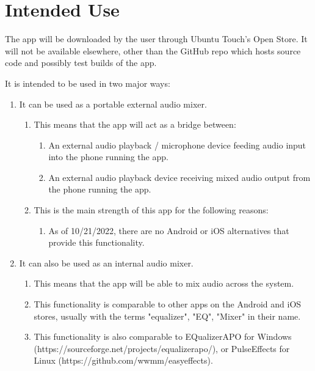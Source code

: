 \section{Intended Use}
The app will be downloaded by the user through Ubuntu Touch's Open Store. 
It will not be available elsewhere, other than the GitHub repo which hosts source code and possibly test builds of the app.

It is intended to be used in two major ways:

\begin{enumerate}
	\item It can be used as a portable external audio mixer.
	\begin{enumerate} 
		\item This means that the app will act as a bridge between:
			\begin{enumerate}
				\item An external audio playback / microphone device feeding audio input into the phone running the app.
				\item An external audio playback device receiving mixed audio output from the phone running the app.
			\end{enumerate}
		\item This is the main strength of this app for the following reasons: 
		\begin{enumerate}
				\item As of 10/21/2022, there are no Android or iOS alternatives that provide this functionality.
			\end{enumerate}
	\end{enumerate}
	\item It can also be used as an internal audio mixer. 
	\begin{enumerate} 
		\item This means that the app will be able to mix audio across the system.
		\item This functionality is comparable to other apps on the Android and iOS stores, usually with the terms "equalizer", "EQ", "Mixer" in their name.
		\item This functionality is also comparable to EQualizerAPO for Windows (https://sourceforge.net/projects/equalizerapo/), or PulseEffects for Linux (https://github.com/wwmm/easyeffects).


\end{enumerate}
\end{enumerate}
